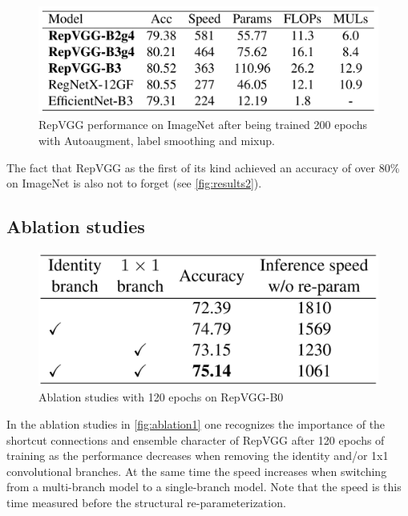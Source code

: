 \begin{figure}[t]
	\begin{center}
		\includegraphics[width=0.8\linewidth]{images/results2.PNG}
	\end{center}
	\caption{RepVGG performance on ImageNet \cite{JiaDeng.2009} after being trained 200 epochs with Autoaugment, label smoothing and mixup.}
	\label{fig:results2}
\end{figure}

The fact that RepVGG as the first of its kind achieved an accuracy of over 80\% on ImageNet \cite{JiaDeng.2009} is also not to forget (see \autoref{fig:results2}).

\subsection{Ablation studies}

\begin{figure}[t]
	\begin{center}
		\includegraphics[width=0.8\linewidth]{images/ablation1.PNG}
	\end{center}
	\caption{Ablation studies with 120 epochs on RepVGG-B0}
	\label{fig:ablation1}
\end{figure}

In the ablation studies in \autoref{fig:ablation1} one recognizes the importance of the shortcut connections and ensemble character of RepVGG after 120 epochs of training as the performance decreases when removing the identity and/or 1x1 convolutional branches. At the same time the speed increases when switching from a multi-branch model to a single-branch model. Note that the speed is this time measured before the structural re-parameterization. 

